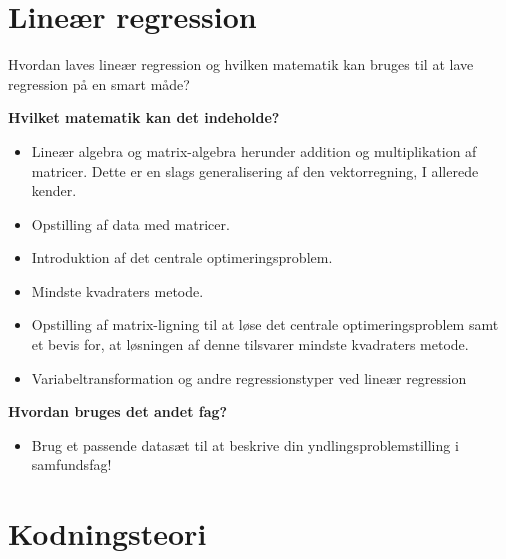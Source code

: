 \documentclass[12pt]{article}
\begin{document}
\newpage
\section*{Lineær regression}
Hvordan laves lineær regression og hvilken matematik kan bruges til at lave regression på en smart måde?
\

\textbf{Hvilket matematik kan det indeholde?}
\begin{itemize}
	\item Lineær algebra og matrix-algebra herunder addition og multiplikation af matricer. 
	Dette er en slags generalisering af den vektorregning, I allerede kender.
	\item Opstilling af data med matricer.
	\item Introduktion af det centrale optimeringsproblem.
	\item Mindste kvadraters metode.
	\item Opstilling af matrix-ligning til at løse det centrale optimeringsproblem samt et 
	bevis for, at løsningen af denne tilsvarer mindste kvadraters metode. 
	\item Variabeltransformation og andre regressionstyper ved lineær regression
\end{itemize}
\textbf{Hvordan bruges det andet fag?}
\begin{itemize}
	\item Brug et passende datasæt til at beskrive din yndlingsproblemstilling i samfundsfag!
\end{itemize}

\newpage
\section*{Kodningsteori}
\end{document}
